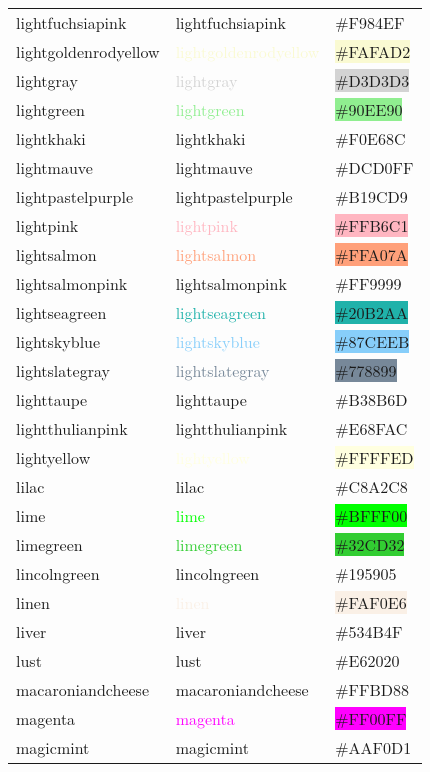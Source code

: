 \documentclass[
]{article}
\begin{document}
\begin{longtable}[]{@{}lll@{}}
lightfuchsiapink & \textcolor{lightfuchsiapink}{lightfuchsiapink} &
\colorbox{lightfuchsiapink}{\#F984EF}\tabularnewline
lightgoldenrodyellow &
\textcolor{lightgoldenrodyellow}{lightgoldenrodyellow} &
\colorbox{lightgoldenrodyellow}{\#FAFAD2}\tabularnewline
lightgray & \textcolor{lightgray}{lightgray} &
\colorbox{lightgray}{\#D3D3D3}\tabularnewline
lightgreen & \textcolor{lightgreen}{lightgreen} &
\colorbox{lightgreen}{\#90EE90}\tabularnewline
lightkhaki & \textcolor{lightkhaki}{lightkhaki} &
\colorbox{lightkhaki}{\#F0E68C}\tabularnewline
lightmauve & \textcolor{lightmauve}{lightmauve} &
\colorbox{lightmauve}{\#DCD0FF}\tabularnewline
lightpastelpurple & \textcolor{lightpastelpurple}{lightpastelpurple} &
\colorbox{lightpastelpurple}{\#B19CD9}\tabularnewline
lightpink & \textcolor{lightpink}{lightpink} &
\colorbox{lightpink}{\#FFB6C1}\tabularnewline
lightsalmon & \textcolor{lightsalmon}{lightsalmon} &
\colorbox{lightsalmon}{\#FFA07A}\tabularnewline
lightsalmonpink & \textcolor{lightsalmonpink}{lightsalmonpink} &
\colorbox{lightsalmonpink}{\#FF9999}\tabularnewline
lightseagreen & \textcolor{lightseagreen}{lightseagreen} &
\colorbox{lightseagreen}{\#20B2AA}\tabularnewline
lightskyblue & \textcolor{lightskyblue}{lightskyblue} &
\colorbox{lightskyblue}{\#87CEEB}\tabularnewline
lightslategray & \textcolor{lightslategray}{lightslategray} &
\colorbox{lightslategray}{\#778899}\tabularnewline
lighttaupe & \textcolor{lighttaupe}{lighttaupe} &
\colorbox{lighttaupe}{\#B38B6D}\tabularnewline
lightthulianpink & \textcolor{lightthulianpink}{lightthulianpink} &
\colorbox{lightthulianpink}{\#E68FAC}\tabularnewline
lightyellow & \textcolor{lightyellow}{lightyellow} &
\colorbox{lightyellow}{\#FFFFED}\tabularnewline
lilac & \textcolor{lilac}{lilac} &
\colorbox{lilac}{\#C8A2C8}\tabularnewline
lime & \textcolor{lime}{lime} & \colorbox{lime}{\#BFFF00}\tabularnewline
limegreen & \textcolor{limegreen}{limegreen} &
\colorbox{limegreen}{\#32CD32}\tabularnewline
lincolngreen & \textcolor{lincolngreen}{lincolngreen} &
\colorbox{lincolngreen}{\#195905}\tabularnewline
linen & \textcolor{linen}{linen} &
\colorbox{linen}{\#FAF0E6}\tabularnewline
liver & \textcolor{liver}{liver} &
\colorbox{liver}{\#534B4F}\tabularnewline
lust & \textcolor{lust}{lust} & \colorbox{lust}{\#E62020}\tabularnewline
macaroniandcheese & \textcolor{macaroniandcheese}{macaroniandcheese} &
\colorbox{macaroniandcheese}{\#FFBD88}\tabularnewline
magenta & \textcolor{magenta}{magenta} &
\colorbox{fuchsia}{\#FF00FF}\tabularnewline
magicmint & \textcolor{magicmint}{magicmint} &
\colorbox{magicmint}{\#AAF0D1}\tabularnewline

\end{longtable}
\end{document}
